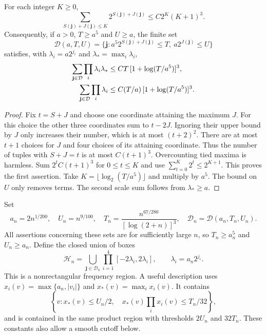 \begin{lemma}
\label{lem:weighted-dyadic-cross}
For each integer $K\ge0$,
\begin{equation}\label{eq:weighted-dyadic-cross}
 \sum_{S(\mathbf j)+J(\mathbf j)\le K}
                       2^{S(\mathbf j)+J(\mathbf j)}
             \le C2^K(K+1)^3.
\end{equation}
Consequently, if $a>0$, $T\ge a^5$ and $U\ge a$, the finite set
\[
 \mathcal D(a,T,U)=\{\mathbf j:
     a^5 2^{S(\mathbf j)+J(\mathbf j)}\le T,
     \ a2^{J(\mathbf j)}\le U\}
\]
satisfies, with $\lambda_i=a2^{j_i}$ and
$\lambda_*=\max_i\lambda_i$,
\begin{align}
 \sum_{\mathbf j\in\mathcal D}\prod_i\lambda_i\lambda_*
    &\le CT\,[1+\log(T/a^5)]^3,\notag\\
 \sum_{\mathbf j\in\mathcal D}\prod_i\lambda_i
    &\le C(T/a)\,[1+\log(T/a^5)]^3.
 \label{eq:dyadic-cross-scale-sums}
\end{align}
\end{lemma}
\begin{proof}
Fix $t=S+J$ and choose one coordinate attaining the maximum $J$.
For this choice the other three coordinates sum to $t-2J$.
Ignoring their upper bound by $J$ only increases their number, which
is at most $(t+2)^2$. There are at most $t+1$ choices for $J$ and
four choices of its attaining coordinate. Thus the number of tuples
with $S+J=t$ is at most $C(t+1)^3$. Overcounting tied maxima is
harmless. Sum $2^tC(t+1)^3$ for $0\le t\le K$ and use
$\sum_{t=0}^K2^t\le2^{K+1}$. This proves the first assertion.
Take $K=\lfloor\log_2(T/a^5)\rfloor$ and multiply by $a^5$.
The bound on $U$ only removes terms. The second scale sum follows
from $\lambda_*\ge a$.
\end{proof}

Set
\begin{equation}\label{eq:adaptive-cross-scales}
 a_n=2n^{1/200},\quad U_n=n^{9/100},\quad
 T_n=\frac{n^{67/280}}{[\log(2+n)]^3},\quad
 \mathcal D_n=\mathcal D(a_n,T_n,U_n).
\end{equation}
All assertions concerning these sets are for sufficiently large $n$,
so $T_n\ge a_n^5$ and $U_n\ge a_n$. Define the closed union of boxes
\begin{equation}\label{eq:adaptive-cross-support}
 \mathcal H_n=\bigcup_{\mathbf j\in\mathcal D_n}
                       \prod_{i=1}^4[-2\lambda_i,2\lambda_i],
 \qquad \lambda_i=a_n2^{j_i}.
\end{equation}
This is a nonrectangular frequency region. A useful description uses
$x_i(v)=\max\{a_n,|v_i|\}$ and $x_*(v)=\max_i x_i(v)$.
It contains
\begin{equation}\label{eq:adaptive-cross-inner}
 \left\{v:x_*(v)\le U_n/2,\quad
                  x_*(v)\prod_i x_i(v)\le T_n/32\right\},
\end{equation}
and is contained in the same product region with thresholds $2U_n$
and $32T_n$. These constants also allow a smooth cutoff below.

